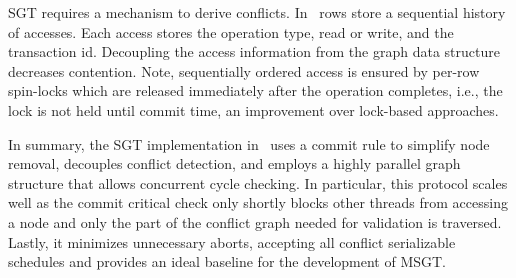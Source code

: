 SGT requires a mechanism to derive conflicts.
In~\cite{DBLP:conf/icde/Durner019} rows store a sequential history of accesses. 
Each access stores the operation type, read or write, and the transaction id.
Decoupling the access information from the graph data structure decreases contention.
Note, sequentially ordered access is ensured by per-row spin-locks which are released immediately 
after the operation completes, i.e., the lock is not held until commit time, an improvement over lock-based approaches.

% 

In summary, the SGT implementation in~\cite{DBLP:conf/icde/Durner019} uses a commit rule to simplify node removal, 
decouples conflict detection, and employs a highly parallel graph structure that allows concurrent cycle checking. In 
particular, this protocol scales well as the commit critical check only shortly blocks other threads from accessing a node 
and only the part of the conflict graph needed for validation is traversed. Lastly, it minimizes unnecessary aborts, 
accepting all conflict serializable schedules and provides an ideal baseline for the development of MSGT. 

